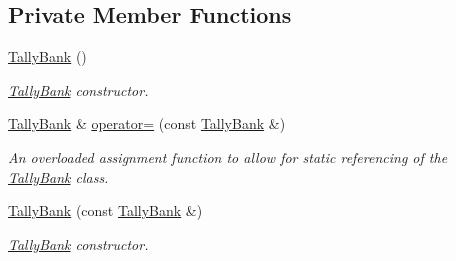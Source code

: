 \subsection*{Private Member Functions}
\begin{DoxyCompactItemize}
\item 
\hypertarget{classTallyBank_a9bfccb9be181dd2f293ba43428923d1c}{\hyperlink{classTallyBank_a9bfccb9be181dd2f293ba43428923d1c}{Tally\-Bank} ()}\label{classTallyBank_a9bfccb9be181dd2f293ba43428923d1c}

\begin{DoxyCompactList}\small\item\em \hyperlink{classTallyBank}{Tally\-Bank} constructor. \end{DoxyCompactList}\item 
\hyperlink{classTallyBank}{Tally\-Bank} \& \hyperlink{classTallyBank_a17f7549e89865f3841fccd876f7c62f7}{operator=} (const \hyperlink{classTallyBank}{Tally\-Bank} \&)
\begin{DoxyCompactList}\small\item\em An overloaded assignment function to allow for static referencing of the \hyperlink{classTallyBank}{Tally\-Bank} class. \end{DoxyCompactList}\item 
\hyperlink{classTallyBank_a336e3deb888c9f7b3a1e6d92aabb78cf}{Tally\-Bank} (const \hyperlink{classTallyBank}{Tally\-Bank} \&)
\begin{DoxyCompactList}\small\item\em \hyperlink{classTallyBank}{Tally\-Bank} constructor. \end{DoxyCompactList}\end{DoxyCompactItemize}
